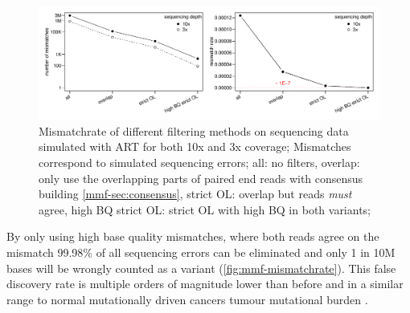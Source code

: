 \begin{figure}[!ht]
\centering
\includegraphics[width=.99\linewidth]{Figures/mismatchrateCleanSequencing.pdf}
\caption[Mismatchrate of different filtering methods]{Mismatchrate of different filtering methods on sequencing data simulated with ART\cite{Huang2011} for both 10x and 3x coverage; Mismatches correspond to simulated sequencing errors; all: no filters, overlap: only use the overlapping parts of paired end reads with consensus building \protect\autoref{mmf-sec:consensus}, strict OL: overlap but reads \emph{must} agree, high BQ strict OL: strict OL with high BQ in both variants;}\label{fig:mmf-mismatchrate}
\end{figure}

By only using high base quality mismatches, where both reads agree on the mismatch 99.98\% of all sequencing errors can be eliminated and only 1 in 10M bases will be wrongly counted as a variant (\autoref{fig:mmf-mismatchrate}). This false discovery rate is multiple orders of magnitude lower than before and in a similar range to normal mutationally driven cancers tumour mutational burden .

